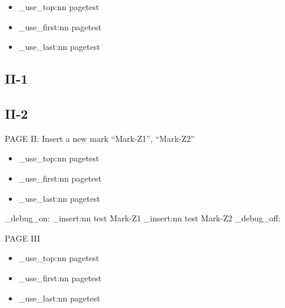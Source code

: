 \documentclass{article}
\begin{document}

\begin{itemize}
  \item \mark_use_top:nn {page}{test} 
  \item \mark_use_first:nn {page}{test}
  \item \mark_use_last:nn {page}{test}
\end{itemize}


\ExplSyntaxOff


\newpage
\subsection{II-1}
\subsection{II-2}
PAGE II: Insert a new mark ``Mark-Z1'', ``Mark-Z2''
\ExplSyntaxOn
\begin{itemize}
  \item \mark_use_top:nn {page}{test} 
  \item \mark_use_first:nn {page}{test}
  \item \mark_use_last:nn {page}{test}
\end{itemize}

\mark_debug_on:
\mark_insert:nn {test} {Mark-Z1}
\mark_insert:nn {test} {Mark-Z2}
\mark_debug_off:
\ExplSyntaxOff

\newpage
PAGE III
\ExplSyntaxOn
\begin{itemize}
  \item \mark_use_top:nn {page}{test} 
  \item \mark_use_first:nn {page}{test}
  \item \mark_use_last:nn {page}{test}
\end{itemize}
\ExplSyntaxOff
\end{document}
